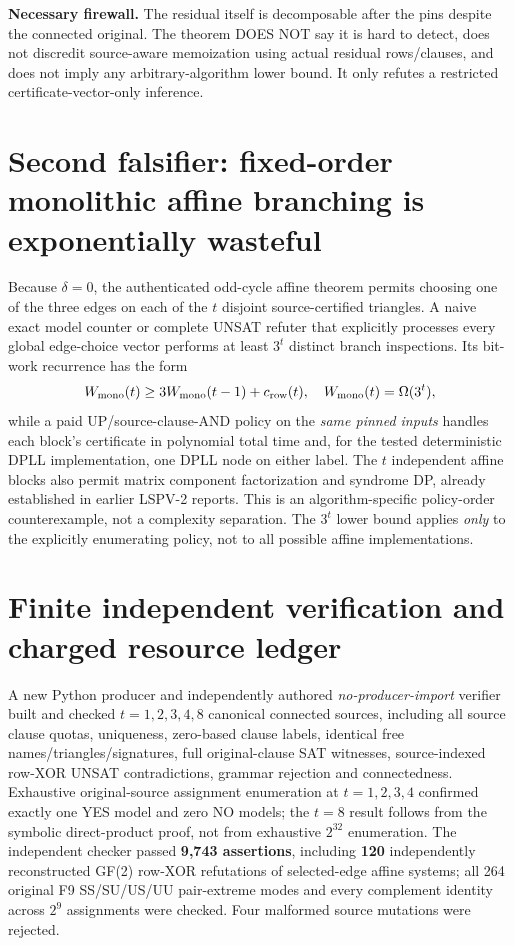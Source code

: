 \documentclass[11pt]{article}
\begin{document}
\noindent\textbf{Necessary firewall.} The residual itself is decomposable after the pins despite the connected original. The theorem DOES NOT say it is hard to detect, does not discredit source-aware memoization using actual residual rows/clauses, and does not imply any arbitrary-algorithm lower bound. It only refutes a restricted certificate-vector-only inference.

\section{Second falsifier: fixed-order monolithic affine branching is exponentially wasteful}
Because $\delta=0$, the authenticated odd-cycle affine theorem permits choosing one of the three edges on each of the $t$ disjoint source-certified triangles. A naive exact model counter or complete UNSAT refuter that explicitly processes every global edge-choice vector performs at least $3^t$ distinct branch inspections. Its bit-work recurrence has the form
\[
W_{\rm mono}(t)\ge 3W_{\rm mono}(t-1)+c_{\rm row}(t),
\quad W_{\rm mono}(t)=\Omega(3^t),
\]
while a paid UP/source-clause-AND policy on the \emph{same pinned inputs} handles each block's certificate in polynomial total time and, for the tested deterministic DPLL implementation, one DPLL node on either label. The $t$ independent affine blocks also permit matrix component factorization and syndrome DP, already established in earlier LSPV-2 reports. This is an algorithm-specific policy-order counterexample, not a complexity separation. The $3^t$ lower bound applies \emph{only} to the explicitly enumerating policy, not to all possible affine implementations.

\section{Finite independent verification and charged resource ledger}
A new Python producer and independently authored \emph{no-producer-import} verifier built and checked $t=1,2,3,4,8$ canonical connected sources, including all source clause quotas, uniqueness, zero-based clause labels, identical free names/triangles/signatures, full original-clause SAT witnesses, source-indexed row-XOR UNSAT contradictions, grammar rejection and connectedness. Exhaustive original-source assignment enumeration at $t=1,2,3,4$ confirmed exactly one YES model and zero NO models; the $t=8$ result follows from the symbolic direct-product proof, not from exhaustive $2^{32}$ enumeration. The independent checker passed \textbf{9,743 assertions}, including \textbf{120} independently reconstructed GF(2) row-XOR refutations of selected-edge affine systems; all 264 original F9 SS/SU/US/UU pair-extreme modes and every complement identity across $2^9$ assignments were checked. Four malformed source mutations were rejected.
\end{document}
